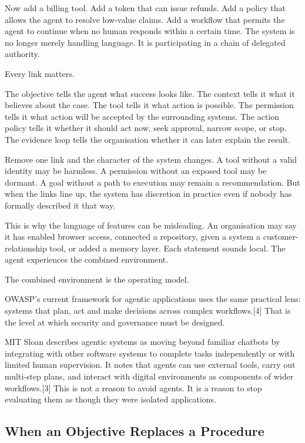 Now add a billing tool. Add a token that can issue refunds. Add a policy
that allows the agent to resolve low-value claims. Add a workflow that
permits the agent to continue when no human responds within a certain
time. The system is no longer merely handling language. It is
participating in a chain of delegated authority.

Every link matters.

The objective tells the agent what success looks like. The context tells
it what it believes about the case. The tool tells it what action is
possible. The permission tells it what action will be accepted by the
surrounding systems. The action policy tells it whether it should act
now, seek approval, narrow scope, or stop. The evidence loop tells the
organisation whether it can later explain the result.

Remove one link and the character of the system changes. A tool without
a valid identity may be harmless. A permission without an exposed tool
may be dormant. A goal without a path to execution may remain a
recommendation. But when the links line up, the system has discretion in
practice even if nobody has formally described it that way.

This is why the language of features can be misleading. An organisation
may say it has enabled browser access, connected a repository, given a
system a customer-relationship tool, or added a memory layer. Each
statement sounds local. The agent experiences the combined environment.

The combined environment is the operating model.

OWASP's current framework for agentic applications uses the same
practical lens: systems that plan, act and make decisions across complex
workflows.{[}4{]} That is the level at which security and governance
must be designed.

MIT Sloan describes agentic systems as moving beyond familiar chatbots
by integrating with other software systems to complete tasks
independently or with limited human supervision. It notes that agents
can use external tools, carry out multi-step plans, and interact with
digital environments as components of wider workflows.{[}3{]} This is
not a reason to avoid agents. It is a reason to stop evaluating them as
though they were isolated applications.

\subsection{When an Objective Replaces a
Procedure}\label{when-an-objective-replaces-a-procedure}


